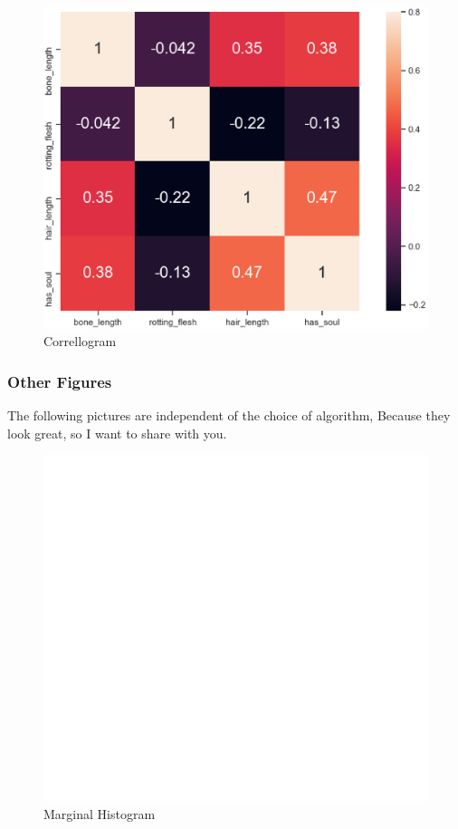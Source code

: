 \begin{figure}[htbp]
	\centering
	\includegraphics[scale=0.4]{figures/corr.eps}
	\caption{Correllogram}\label{fig:corr}
\end{figure}


\subsubsection{Other Figures}


The following pictures 
are independent of 
the choice of algorithm,
Because they look great, 
so I want to share with you.

\begin{figure}[h]\centering
	\includegraphics[scale=0.4]{figures/MHis.eps}
	\caption{Marginal Histogram}
\end{figure}

